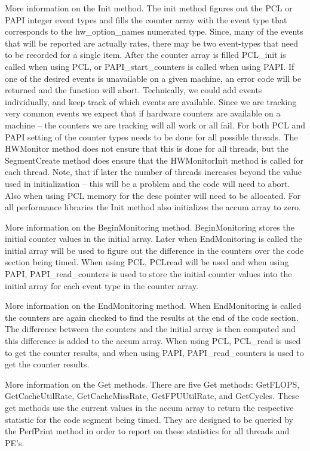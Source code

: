 More information on the Init method. The init method figures out the PCL or
PAPI integer event types and fills the counter array with the event type that
corresponds to the hw\_option\_names numerated type. Since, many of the events
that will be reported are actually rates, there may be two event-types that
need to be recorded for a single item. After the counter array is filled PCL\_init
is called when using PCL, or PAPI\_start\_counters is called when using PAPI.
If one of the desired events is unavailable on a given machine, an error
code will be returned and the function will abort. Technically, we could
add events individually, and keep track of which events are available. Since
we are tracking very common events we expect that if hardware counters are
available on a machine -- the counters we are tracking will all work or all fail.
For both PCL and PAPI setting of the counter types needs to be done for
all possible threads. The HWMonitor method does not ensure that this is done
for all threads, but the SegmentCreate method does ensure that the HWMonitorInit
method is called for each thread.  Note, that if later
the number of threads increases beyond the value used in initialization -- this
will be a problem and the code will need to abort. Also when using PCL memory
for the desc pointer will need to be allocated. For all performance libraries the 
Init method also initializes the accum array to zero.

More information on the BeginMonitoring method. BeginMonitoring stores the initial
counter values in the initial array. Later when EndMonitoring is called the initial
array will be used to figure out the difference in the counters over the code 
section being timed. When using PCL, PCLread will be used and when using PAPI, 
PAPI\_read\_counters is used to store the initial counter values into the initial array 
for each event type in the counter array.

More information on the EndMonitoring method. When EndMonitoring is called
the counters are again checked to find the results at the end of the code
section. The difference between the counters and the initial array is then
computed and this difference is added to the accum array. When using PCL,
PCL\_read is used to get the counter results, and when using PAPI, PAPI\_read\_counters
is used to get the counter results.

More information on the Get methods. There are five Get methods: GetFLOPS, GetCacheUtilRate,
GetCacheMissRate, GetFPUUtilRate, and GetCycles. These get methods use the current values
in the accum array to return the respective statistic for the code segment being timed.
They are designed to be queried by the PerfPrint method in order to report on these
statistics for all threads and PE's.

